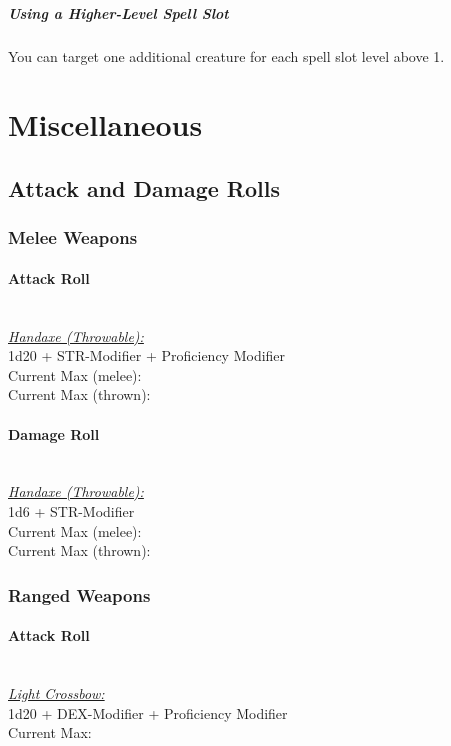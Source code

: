 \documentclass[letterpaper,openany,oneside,twocolumn]{book}
\begin{document}
\subparagraph*{Using a Higher-Level Spell Slot} You can target one additional creature for each spell slot level above 1.

\section*{Miscellaneous}
\subsection*{Attack and Damage Rolls}
\subsubsection*{Melee Weapons}
\paragraph*{Attack Roll}\hfill\\
\underline{\textit{Handaxe (Throwable):}}\\
1d20 + STR-Modifier + Proficiency Modifier\\
\indent Current Max (melee): \\
\indent Current Max (thrown): 
\paragraph*{Damage Roll}\hfill\\
\underline{\textit{Handaxe (Throwable):}}\\
1d6 + STR-Modifier\\
\indent Current Max (melee): \\
\indent Current Max (thrown): 
\subsubsection*{Ranged Weapons}
\paragraph*{Attack Roll}\hfill\\
\underline{\textit{Light Crossbow:}}\\
1d20 + DEX-Modifier + Proficiency Modifier\\
\indent Current Max: 
\end{document}
